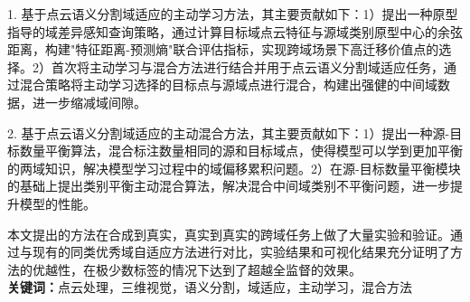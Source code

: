 
1. 基于点云语义分割域适应的主动学习方法，其主要贡献如下：1）提出一种原型指导的域差异感知查询策略，通过计算目标域点云特征与源域类别原型中心的余弦距离，构建"特征距离-预测熵"联合评估指标，实现跨域场景下高迁移价值点的选择。2）首次将主动学习与混合方法进行结合并用于点云语义分割域适应任务，通过混合策略将主动学习选择的目标点与源域点进行混合，构建出强健的中间域数据，进一步缩减域间隙。

2. 基于点云语义分割域适应的主动混合方法，其主要贡献如下：1）提出一种源-目标数量平衡算法，混合标注数量相同的源和目标域点，使得模型可以学到更加平衡的两域知识，解决模型学习过程中的域偏移累积问题。2）在源-目标数量平衡模块的基础上提出类别平衡主动混合算法，解决混合中间域类别不平衡问题，进一步提升模型的性能。

本文提出的方法在合成到真实，真实到真实的跨域任务上做了大量实验和验证。通过与现有的同类优秀域自适应方法进行对比，实验结果和可视化结果充分证明了方法的优越性，在极少数标签的情况下达到了超越全监督的效果。\\

\noindent\songti\textbf{关键词：}点云处理，三维视觉，语义分割，域适应，主动学习，混合方法

\clearpage